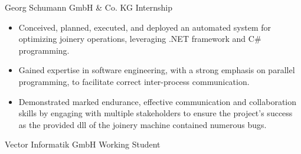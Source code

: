 \documentclass[11pt, letterpaper]{moderncv}
\newcommand{\de}[1]{}
\newcommand{\en}[1]{#1}
\newcommand{\de}[1]{#1}
\newcommand{\en}[1]{}
\begin{document}
        {Georg Schumann GmbH \& Co. KG}
        {\en{Internship}\de{Praktikum}}
        {}
        {}
        {\en{
        \begin{itemize}
            \item Conceived, planned, executed, and deployed an automated system for optimizing joinery operations, leveraging .NET framework and C\# programming.
            \item Gained expertise in software engineering, with a strong emphasis on parallel programming, to facilitate correct inter-process communication.
            \item Demonstrated marked endurance, effective communication and collaboration skills by engaging with multiple stakeholders to ensure the project's success as the provided dll of the joinery machine contained numerous bugs. 
        \end{itemize}}
        \de{
        \begin{itemize}
            \item Konzeption, Planung, Ausführung und Einsatz eines automatisierten Systems zur Optimierung von Abbundarbeiten unter Verwendung von .NET Framework und C\#-Programmierung
            \item Erlangung von Fachkenntnissen in der Softwareentwicklung mit Schwerpunkt auf paralleler Programmierung.
            \item Demonstration von Hartnäckigkeit, effektiver Kommunikations- und Kooperationsfähigkeiten durch die Zusammenarbeit mit verschiedenen Interessengruppen, um den Erfolg des Projekts zu gewährleisten.
        \end{itemize}}
        }
        {\en{Vector Informatik GmbH}\de{Vector Informatik GmbH}}
        {\en{Working Student}\de{Werkstudent}}
        {}
        {}
\end{document}
